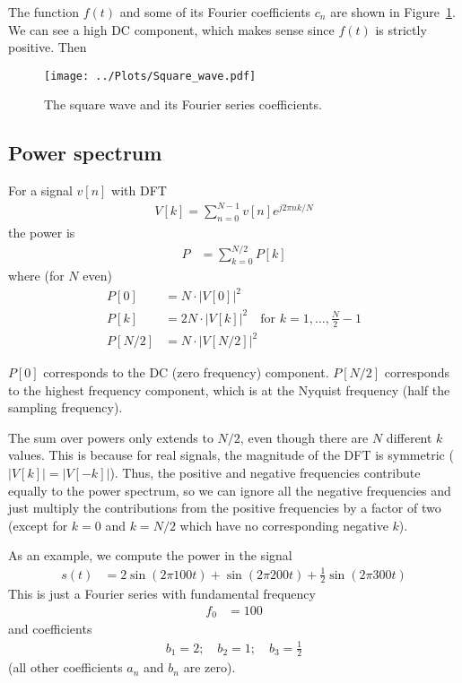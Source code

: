 \documentclass[twocolumn]{myarticle}
\begin{document}
The function $ f(t) $ and some of its Fourier coefficients $ c_n $ are shown in Figure~\ref{fig:square_wave}.
We can see a high DC component, which makes sense since $ f(t) $ is strictly positive.
Then 


\begin{figure}[ht]
    \centering
    \texttt{[image: ../Plots/Square\_wave.pdf]}
    \caption{The square wave and its Fourier series coefficients.}
    \label{fig:square_wave}
\end{figure}

\subsection{Power spectrum}
\label{subsec:power_spectrum}

For a signal $ v[n] $ with DFT 
\begin{align}
    V[k] = \sum_{n = 0}^{N-1} v[n] e^{j 2 \pi n k / N}
\end{align}
the power is
\begin{align}
    P &= \sum_{k=0}^{N/2} P[k]
\end{align}
where (for $ N $ even)
\begin{align}
    P[0] &=   N \cdot \big| V[0]   \big|^2
    \\
    P[k] &= 2 N \cdot \big| V[k]   \big|^2 \quad \text{for } k = 1, \ldots, \frac{N}{2} - 1
    \\
    P[N/2] &= N \cdot \big| V[N/2] \big|^2 
\end{align}

$ P[0] $ corresponds to the DC (zero frequency) component.
$ P[N/2] $ corresponds to the highest frequency component, which is at the Nyquist frequency (half the sampling frequency).

The sum over powers only extends to $ N/2 $, even though there are $ N $ different $ k $ values.
This is because for real signals, the magnitude of the DFT is symmetric ($ |V[k]| = |V[-k]| $).
Thus, the positive and negative frequencies contribute equally to the power spectrum, so we can ignore all the negative frequencies and just multiply the contributions from the positive frequencies by a factor of two (except for $ k = 0 $ and $ k = N/2 $ which have no corresponding negative $ k $).

As an example, we compute the power in the signal
\begin{align}
    s(t) &= 2 \sin(2 \pi 100 t) + \sin(2 \pi 200 t) + \frac{1}{2} \sin(2 \pi 300 t)
\end{align}
This is just a Fourier series with fundamental frequency
\begin{align}
    f_0 &= 100
\end{align}
and coefficients
\begin{align}
    b_1 = 2; \quad b_2 = 1; \quad b_3 = \frac{1}{2} 
\end{align}
(all other coefficients $ a_n $ and $ b_n $ are zero).
\end{document}
